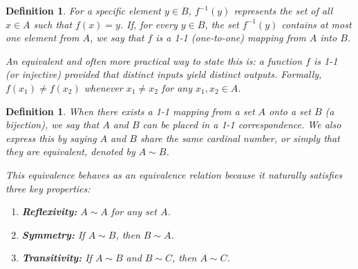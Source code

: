 \documentclass{article}
\theoremstyle{mythm}
\newtheorem{definition}[theorem]{Definition}
\begin{document}
\begin{definition}
For a specific element $y \in B$, $f^{-1}(y)$ represents the set of all $x \in A$ such that $f(x) = y$. If, for every $y \in B$, the set $f^{-1}(y)$ contains at most one element from $A$, we say that $f$ is a \textit{1-1 (one-to-one)} mapping from $A$ into $B$. 

An equivalent and often more practical way to state this is: a function $f$ is 1-1 (or injective) provided that distinct inputs yield distinct outputs. Formally, $f(x_1) \neq f(x_2)$ whenever $x_1 \neq x_2$ for any $x_1, x_2 \in A$.
\end{definition}
\begin{definition}
When there exists a 1-1 mapping from a set $A$ onto a set $B$ (a bijection), we say that $A$ and $B$ can be placed in a 1-1 \textit{correspondence}. We also express this by saying $A$ and $B$ share the same \textit{cardinal number}, or simply that they are \textit{equivalent}, denoted by $A \sim B$. 

This equivalence behaves as an \textit{equivalence relation} because it naturally satisfies three key properties:
\begin{enumerate}
    \item \textbf{Reflexivity:} $A \sim A$ for any set $A$.
    \item \textbf{Symmetry:} If $A \sim B$, then $B \sim A$.
    \item \textbf{Transitivity:} If $A \sim B$ and $B \sim C$, then $A \sim C$.
\end{enumerate}
\end{definition}
\end{document}
